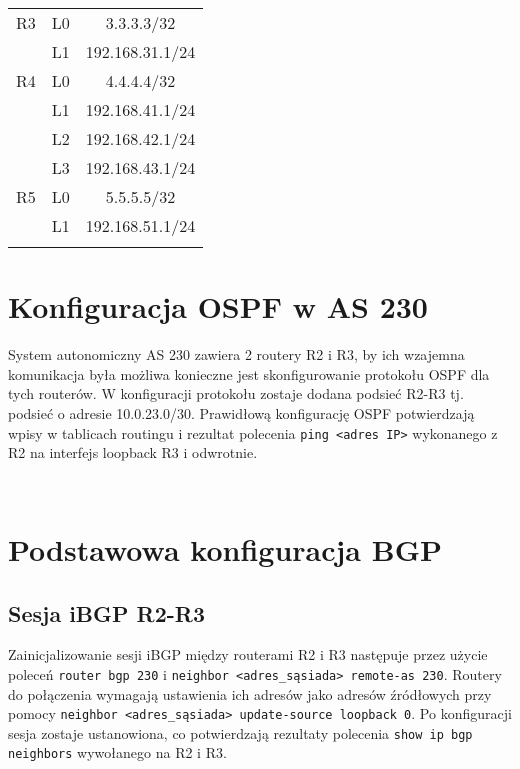 \documentclass[a4paper,12pt,notitlepage]{article}
\begin{document}
\begin{table}[htbp]
{\begin{tabular}{|*3c|}
        \hline
            R3 & L0 & 3.3.3.3/32      \\
               & L1 & 192.168.31.1/24 \\
        \hline
            R4 & L0 & 4.4.4.4/32      \\
               & L1 & 192.168.41.1/24 \\
               & L2 & 192.168.42.1/24 \\
               & L3 & 192.168.43.1/24 \\
        \hline
            R5 & L0 & 5.5.5.5/32      \\
               & L1 & 192.168.51.1/24 \\
        \hhline{|===|}
    \end{tabular}}
\end{table}

\section{Konfiguracja OSPF w AS 230}
System autonomiczny AS 230 zawiera 2 routery R2 i R3, by ich wzajemna komunikacja była możliwa konieczne jest skonfigurowanie protokołu OSPF dla tych routerów. W konfiguracji protokołu zostaje dodana podsieć R2-R3 tj. podsieć o adresie 10.0.23.0/30. Prawidłową konfigurację OSPF potwierdzają wpisy w tablicach routingu i rezultat polecenia  \texttt{ping <adres IP>} wykonanego z R2 na interfejs loopback R3 i odwrotnie.
\inputminted[label=Pingowanie interfejsu loopback R3 z R2, firstline=178, lastline=183]{text}{Routers/R2.txt}
\inputminted[label=Pingowanie interfejsu loopback R2 z R3, firstline=306, lastline=311]{text}{Routers/R3.txt}
\section{Podstawowa konfiguracja BGP}
\subsection{Sesja iBGP R2-R3}
Zainicjalizowanie sesji iBGP między routerami R2 i R3 następuje przez użycie poleceń  \texttt{router bgp 230} i  \texttt{neighbor <adres_sąsiada> remote-as 230}. Routery do połączenia wymagają ustawienia ich adresów jako adresów źródłowych przy pomocy  \texttt{neighbor <adres_sąsiada> update-source loopback 0}. Po konfiguracji sesja zostaje ustanowiona, co potwierdzają rezultaty polecenia  \texttt{show ip bgp neighbors} wywołanego na R2 i R3.
\inputminted[label=Stan sesji BGP po ustawieniu adresów źródłowychna R2, firstline=242, lastline=244]{text}{Routers/R2.txt}
\inputminted[label=Stan sesji BGP po ustawieniu adresów źródłowychna R3, firstline=439, lastline=441]{text}{Routers/R3.txt}
\end{document}
